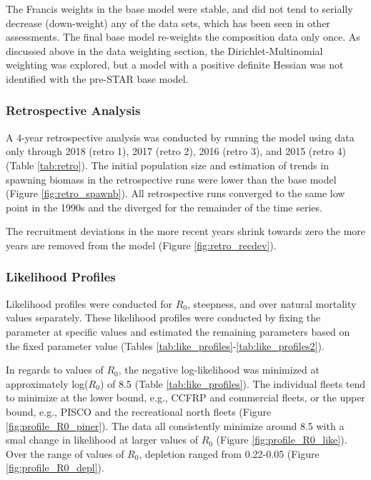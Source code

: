 \documentclass[12pt,]{article}
\begin{document}
The Francis weights in the base model were stable, and did not tend to
serially decrease (down-weight) any of the data sets, which has been
seen in other assessments. The final base model re-weights the
composition data only once. As discussed above in the data weighting
section, the Dirichlet-Multinomial weighting was explored, but a model
with a positive definite Hessian was not identified with the pre-STAR
base model.

\subsubsection{Retrospective Analysis}\label{retrospective-analysis}

A 4-year retrospective analysis was conducted by running the model using
data only through 2018 (retro 1), 2017 (retro 2), 2016 (retro 3), and
2015 (retro 4) (Table \ref{tab:retro}). The initial population size and
estimation of trends in spawning biomass in the retrospective runs were
lower than the base model (Figure \ref{fig:retro_spawnb}). All
retrospective runs converged to the same low point in the 1990s and the
diverged for the remainder of the time series.

The recruitment deviations in the more recent years shrink towards zero
the more years are removed from the model (Figure
\ref{fig:retro_recdev}).

\subsubsection{Likelihood Profiles}\label{likelihood-profiles}

Likelihood profiles were conducted for \(R_0\), steepness, and over
natural mortality values separately. These likelihood profiles were
conducted by fixing the parameter at specific values and estimated the
remaining parameters based on the fixed parameter value (Tables
\ref{tab:like_profiles}-\ref{tab:like_profiles2}).

In regards to values of \(R_0\), the negative log-likelihood was
minimized at approximately log(\(R_0\)) of 8.5 (Table
\ref{tab:like_profiles}). The individual fleets tend to minimize at the
lower bound, e.g., CCFRP and commercial fleets, or the upper bound,
e.g., PISCO and the recreational north fleets (Figure
\ref{fig:profile_R0_piner}). The data all consistently minimize around
8.5 with a smal change in likelihood at larger values of \(R_0\) (Figure
\ref{fig:profile_R0_like}). Over the range of values of \(R_0\),
depletion ranged from 0.22-0.05 (Figure \ref{fig:profile_R0_depl}).
\end{document}
